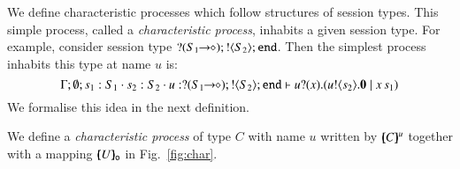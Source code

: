 \smallskip

\label{ss:char}
\noi 
We define characteristic processes 
which follow structures of session types. 
This simple process, called a {\em characteristic process}, 
inhabits a given session type. For example, consider 
session type $? (S_1\!\! \rightarrow\!\! \diamond) ; ! \langle S_2 \rangle ; \mathtt{end}$. 
Then the simplest process inhabits this type at name $u$ is:
\[
\Gamma; \emptyset; s_1: S_1 \cdot s_2: S_2 \cdot u: ? (S_1\!\! \rightarrow\!\! \diamond) ; ! \langle S_2 \rangle ; \mathtt{end} \vdash u ? (x) . (u ! \langle s_2 \rangle . \mathbf{0} \;|\; x\, {s_1})
\]
We formalise this idea in the next definition. 

\smallskip  
   


\smallskip



\begin{definition}\rm
We define a {\em characteristic process}
of type $C$ with name $u$ written by 
$[\!\!(C)\!\!]^{u}$ together with  
a mapping $[\!\!(U)\!\!]_{\mathsf{o}}$ in Fig.~\ref{fig:char}. 
\end{definition}

\smallskip

